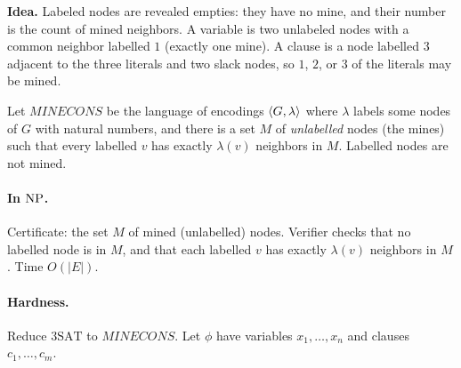 \begin{soln}
\textbf{Idea.} Labeled nodes are revealed empties: they have no mine, and their number is the count of mined neighbors. A variable is two unlabeled nodes with a common neighbor labelled $1$ (exactly one mine). A clause is a node labelled $3$ adjacent to the three literals and two slack nodes, so $1$, $2$, or $3$ of the literals may be mined.

Let $\mathit{MINECONS}$ be the language of encodings $\langle G,\lambda\rangle$ where $\lambda$ labels some nodes of $G$ with natural numbers, and there is a set $M$ of \emph{unlabelled} nodes (the mines) such that every labelled $v$ has exactly $\lambda(v)$ neighbors in $M$. Labelled nodes are not mined.

\paragraph{In $\mathrm{NP}$.}
Certificate: the set $M$ of mined (unlabelled) nodes. Verifier checks that no labelled node is in $M$, and that each labelled $v$ has exactly $\lambda(v)$ neighbors in $M$. Time $O(|E|)$.

\paragraph{Hardness.}
Reduce $3\mathrm{SAT}$ to $\mathit{MINECONS}$. Let $\phi$ have variables $x_1,\dots,x_n$ and clauses $c_1,\dots,c_m$.

\begin{center}
\end{center}


\end{soln}
